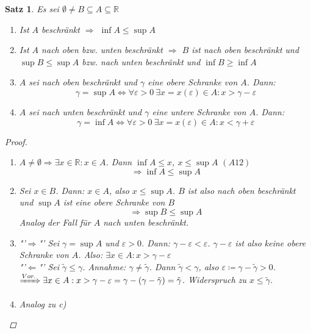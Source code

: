 \documentclass[titlepage,ngerman,a4paper,headsepline]{scrartcl}
\newcommand{\R}{\mathbb{R}}
\theoremstyle{named}
\theoremstyle{dotless}
\newtheorem{satz}[namedtheorem]{Satz}
\begin{document}
\begin{satz} \label{1.2:satz}
	Es sei $\emptyset \neq B \subseteq A \subseteq \R$
	\begin{enumerate}
		\item Ist $A$ beschränkt $\Rightarrow$ $\inf A \leq \sup A$
		\item Ist $A$ nach oben bzw. unten beschränkt $\Rightarrow$ $B$ ist nach oben beschränkt und $\sup B \leq \sup A$ bzw. nach unten beschränkt und $\inf B \geq \inf A$
		\item $A$ sei nach oben beschränkt und $\gamma$ eine obere Schranke von $A$. Dann:
			$$
				\gamma = \sup A \iff \forall \varepsilon > 0 ~\exists x = x(\varepsilon) \in A : x > \gamma - \varepsilon
			$$
		\item $A$ sei nach unten beschränkt und $\gamma$ eine untere Schranke von $A$. Dann:
			$$
				\gamma = \inf A \iff \forall \varepsilon > 0 ~\exists x = x(\varepsilon) \in A : x < \gamma + \varepsilon
			$$	
	\end{enumerate}

	\begin{proof} ~\ 
		\begin{enumerate}
			\item $A \neq \emptyset \Rightarrow \exists x \in \R : x \in A$. Dann $\inf A \leq x$, $x \leq \sup A$ $(A12)$
			$$ \Rightarrow \inf A \leq \sup A $$
			\item Sei $x \in B$. Dann: $x \in A$, also $x \leq \sup A$. $B$ ist also nach oben beschränkt und $\sup A$ ist eine obere Schranke von $B$
			$$ \Rightarrow \sup B \leq \sup A $$
			Analog der Fall für $A$ nach unten beschränkt.
			\item "'$\Rightarrow$"' Sei $\gamma = \sup A$ und $\varepsilon > 0$. Dann: $\gamma - \varepsilon < \varepsilon$. $\gamma - \varepsilon$ ist also keine obere Schranke von $A$. Also: $\exists x \in A : x > \gamma - \varepsilon$ \\
				"'$\Leftarrow$"' Sei $\tilde{\gamma} \leq \gamma$. Annahme: $\gamma \neq \tilde{\gamma}$. Dann $\tilde{\gamma} < \gamma$, also $\varepsilon \coloneqq \gamma - \tilde{\gamma} > 0$.\\
				$\xRightarrow[]{Vor.} \exists x \in A: x > \gamma - \varepsilon = \gamma- (\gamma - \tilde{\gamma}) = \tilde{\gamma}$. Widerspruch zu $x \leq \tilde{\gamma}$.
			\item Analog zu c)
		\end{enumerate}
	\end{proof}
\end{satz}
\end{document}
